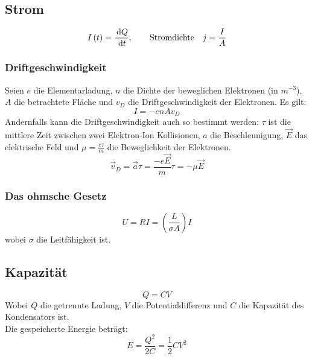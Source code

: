 \subsection{Strom}
\begin{equation}
I\left(t\right) = \frac{\,\mathrm{d} Q}{\,\mathrm{d} t}, \qquad\mathrm{Stromdichte}\quad j = \frac{I}{A}
\end{equation}
\subsubsection{Driftgeschwindigkeit}
Seien $e$ die Elementarladung, $n$ die Dichte der beweglichen Elektronen (in $m^{-3}$), $A$ die betrachtete Fläche und $v_D$ die Driftgeschwindigkeit der Elektronen. Es gilt:
\begin{equation}
I = -e n A  v_D
\end{equation}
Andernfalls kann die Driftgeschwindigkeit auch so bestimmt werden: $\tau$ ist die mittlere Zeit zwischen zwei Elektron-Ion Kollisionen, $a$ die Beschleunigung, $\vec{E}$ das elektrische Feld und $\mu = \frac{e\tau}{m}$ die Beweglichkeit der Elektronen.
\begin{equation}
\vec{v}_D = \vec{a} \tau = \frac{-e\vec{E}}{m}\tau = -\mu\vec{E}
\end{equation}
\subsubsection{Das ohmsche Gesetz}
\begin{equation}
U = R I = \left( \frac{L}{\sigma A} \right) I
\end{equation}
wobei $\sigma$ die Leitfähigkeit ist.
\subsection{Kapazität}
\begin{equation}
Q = CV
\end{equation}
Wobei $Q$ die getrennte Ladung, $V$ die Potentialdifferenz und $C$ die Kapazität des Kondensators ist. \\
Die gespeicherte Energie beträgt:
\begin{equation}
E = \frac{Q^2}{2C} = \frac{1}{2}CV^2
\end{equation}
